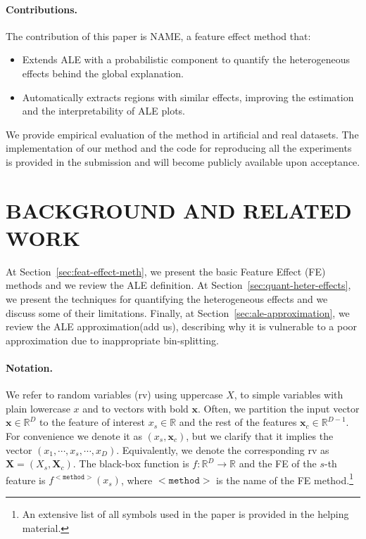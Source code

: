 \documentclass[twoside]{article}
\newcommand{\xc}{\mathbf{x}_c}
\newcommand{\xb}{\mathbf{x}}
\begin{document}
\paragraph{Contributions.} The contribution of this paper is NAME, a
feature effect method that:

\begin{itemize}
\item Extends ALE with a probabilistic component to quantify the
  heterogeneous effects behind the global explanation.
\item Automatically extracts regions with similar effects, improving
  the estimation and the interpretability of ALE plots.
\end{itemize}

We provide empirical evaluation of the method in artificial and real
datasets. The implementation of our method and the code for
reproducing all the experiments is provided in the submission and will
become publicly available upon acceptance.


\section{BACKGROUND AND RELATED WORK}

At Section~\ref{sec:feat-effect-meth}, we present the basic Feature
Effect (FE) methods and we review the ALE
definition\citep{apley2020visualizing}. At
Section~\ref{sec:quant-heter-effects}, we present the techniques for
quantifying the heterogeneous effects and we discuss some of their
limitations. Finally, at Section~\ref{sec:ale-approximation}, we
review the ALE approximation\citep{apley2020visualizing}(add us),
describing why it is vulnerable to a poor approximation due to
inappropriate bin-splitting.

\paragraph{Notation.} We refer to random variables (rv) using
uppercase \( X \), to simple variables with plain lowercase \( x \)
and to vectors with bold \( \xb \). Often, we partition the input
vector \(\xb \in \mathbb{R}^D\) to the feature of interest
\(x_s \in \mathbb{R} \) and the rest of the features
\(\xc \in \mathbb{R}^{D-1}\). For convenience we denote it as
\((x_s, \mathbf{x}_c)\), but we clarify that it implies the vector
\((x_1, \cdots , x_s, \cdots, x_D)\). Equivalently, we denote the
corresponding rv as \(\mathbf{X} = (X_s, \mathbf{X}_c)\). The
black-box function is \(f : \mathbb{R}^D \rightarrow \mathbb{R}\) and
the FE of the \(s\)-th feature is \(f^{\mathtt{<method>}}(x_s)\),
where \(\mathtt{<method>}\) is the name of the FE method.\footnote{An
  extensive list of all symbols used in the paper is provided in the
  helping material.}
\end{document}
